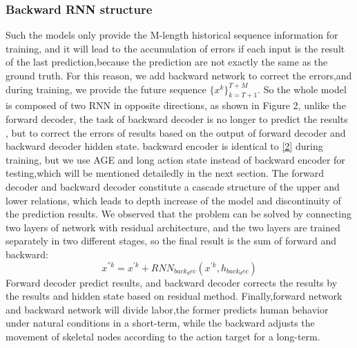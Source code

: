 \documentclass[conference]{IEEEtran}
\begin{document}
\subsubsection{Backward RNN structure}
Such the models only provide the M-length historical sequence information for training, and it will lead to the accumulation of errors if each input is the result of the last prediction,because the prediction are not exactly the same as the ground truth. For this reason, we add backward network to correct the errors,and during training, we provide the future sequence $\{x^k\}^{T+M}_{k=T+1}$.
So the whole model is composed of two RNN in opposite directions, as shown in Figure 2, unlike the forward decoder, the task of backward decoder is no longer to predict the results , but to correct the errors of results based on the output of forward decoder and backward decoder hidden state. backward encoder is identical to \eqref{2} during training,
but we use AGE and long action state instead of backward encoder for testing,which will be mentioned detailedly in the next section.
The forward decoder and backward decoder constitute a cascade structure of the upper and lower relations, which leads to depth increase of the model and discontinuity of the prediction results. We observed that the problem can be solved by connecting two layers of network with residual architecture, and the two layers are trained separately in two different stages, so the final result is the sum of forward and backward:
\begin{equation}
x^{''k} = x^{'k} + RNN_{back_dec}(x^{'k} , h_{back_dec})\label{3}
\end{equation}
Forward decoder predict results, and backward decoder corrects the results by the results and hidden state based on residual method. Finally,forward network and backward network will divide labor,the former predicts human behavior under natural conditions in a short-term, while the backward adjusts the movement of skeletal nodes according to the action target for a long-term.
\end{document}
